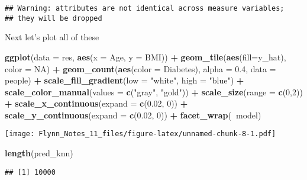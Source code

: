 \documentclass[]{article}
\newenvironment{Shaded}{\begin{snugshade}}{\end{snugshade}}
\newcommand{\KeywordTok}[1]{\textcolor[rgb]{0.13,0.29,0.53}{\textbf{#1}}}
\newcommand{\DataTypeTok}[1]{\textcolor[rgb]{0.13,0.29,0.53}{#1}}
\newcommand{\DecValTok}[1]{\textcolor[rgb]{0.00,0.00,0.81}{#1}}
\newcommand{\FloatTok}[1]{\textcolor[rgb]{0.00,0.00,0.81}{#1}}
\newcommand{\StringTok}[1]{\textcolor[rgb]{0.31,0.60,0.02}{#1}}
\newcommand{\OtherTok}[1]{\textcolor[rgb]{0.56,0.35,0.01}{#1}}
\newcommand{\OperatorTok}[1]{\textcolor[rgb]{0.81,0.36,0.00}{\textbf{#1}}}
\newcommand{\NormalTok}[1]{#1}
\begin{document}
\begin{verbatim}
## Warning: attributes are not identical across measure variables;
## they will be dropped
\end{verbatim}

Next let's plot all of these

\begin{Shaded}
\begin{Highlighting}[]
\KeywordTok{ggplot}\NormalTok{(}\DataTypeTok{data =}\NormalTok{ res, }\KeywordTok{aes}\NormalTok{(}\DataTypeTok{x =}\NormalTok{ Age, }\DataTypeTok{y =}\NormalTok{ BMI)) }\OperatorTok{+}
\StringTok{  }\KeywordTok{geom_tile}\NormalTok{(}\KeywordTok{aes}\NormalTok{(}\DataTypeTok{fill=}\NormalTok{y_hat), }\DataTypeTok{color =} \OtherTok{NA}\NormalTok{) }\OperatorTok{+}
\StringTok{  }\KeywordTok{geom_count}\NormalTok{(}\KeywordTok{aes}\NormalTok{(}\DataTypeTok{color =}\NormalTok{ Diabetes), }\DataTypeTok{alpha =} \FloatTok{0.4}\NormalTok{, }\DataTypeTok{data =}\NormalTok{ people) }\OperatorTok{+}
\StringTok{  }\KeywordTok{scale_fill_gradient}\NormalTok{(}\DataTypeTok{low =} \StringTok{"white"}\NormalTok{, }\DataTypeTok{high =} \StringTok{"blue"}\NormalTok{) }\OperatorTok{+}
\StringTok{  }\KeywordTok{scale_color_manual}\NormalTok{(}\DataTypeTok{values =} \KeywordTok{c}\NormalTok{(}\StringTok{"gray"}\NormalTok{, }\StringTok{"gold"}\NormalTok{)) }\OperatorTok{+}
\StringTok{  }\KeywordTok{scale_size}\NormalTok{(}\DataTypeTok{range =} \KeywordTok{c}\NormalTok{(}\DecValTok{0}\NormalTok{,}\DecValTok{2}\NormalTok{)) }\OperatorTok{+}
\StringTok{  }\KeywordTok{scale_x_continuous}\NormalTok{(}\DataTypeTok{expand =} \KeywordTok{c}\NormalTok{(}\FloatTok{0.02}\NormalTok{, }\DecValTok{0}\NormalTok{)) }\OperatorTok{+}
\StringTok{  }\KeywordTok{scale_y_continuous}\NormalTok{(}\DataTypeTok{expand =} \KeywordTok{c}\NormalTok{(}\FloatTok{0.02}\NormalTok{, }\DecValTok{0}\NormalTok{)) }\OperatorTok{+}
\StringTok{  }\KeywordTok{facet_wrap}\NormalTok{(}\OperatorTok{~}\NormalTok{model)}
\end{Highlighting}
\end{Shaded}

\texttt{[image: Flynn\_Notes\_11\_files/figure-latex/unnamed-chunk-8-1.pdf]}

\begin{Shaded}
\begin{Highlighting}[]
\KeywordTok{length}\NormalTok{(pred_knn)}
\end{Highlighting}
\end{Shaded}

\begin{verbatim}
## [1] 10000
\end{verbatim}
\end{document}
